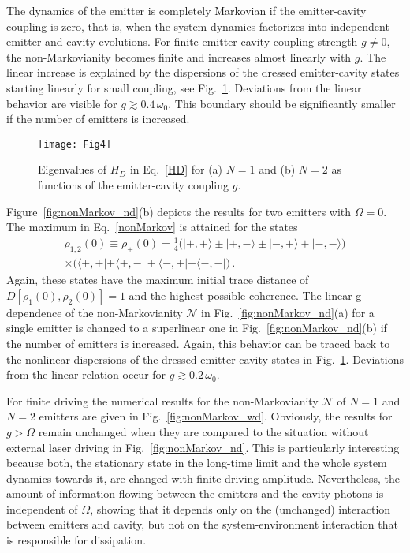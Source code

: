 \documentclass[aps,pra,twocolumn,showpacs,showkeys,10pt,nofootinbib]{revtex4-1}
\begin{document}
The dynamics of the emitter is completely Markovian if the emitter-cavity coupling is zero, that is, when the system dynamics factorizes into independent emitter and cavity evolutions.
For finite emitter-cavity coupling strength $g\neq0$, the non-Markovianity becomes finite and increases almost linearly with $g$.
The linear increase is explained by the dispersions of the dressed emitter-cavity states starting linearly for small coupling, see Fig.~\ref{fig:disp}.
Deviations from the linear behavior are visible for $g\gtrsim0.4\,\omega_0$.
This boundary should be significantly smaller if the number of emitters is increased.

\begin{figure}
  \texttt{[image: Fig4]}
  \caption{\label{fig:disp}Eigenvalues of $H_D$ in Eq.~\eqref{HD} for (a) $N=1$ and (b) $N=2$ as functions of the emitter-cavity coupling $g$.}
\end{figure}

Figure~\ref{fig:nonMarkov_nd}(b) depicts the results for two emitters with $\Omega=0$.
The maximum in Eq.~\eqref{nonMarkov} is attained for the states
\begin{multline}\label{preparation2}
  \rho_{1,2}(0) \equiv \rho_\pm(0) = \frac{1}{4} \big( | +, + \rangle \pm | +, - \rangle \pm | -, + \rangle + | -, - \rangle \big) \\
    \times \big( \langle +, + | \pm \langle +, - | \pm \langle -, + | + \langle -, - | \big) \,.
\end{multline}
Again, these states have the maximum initial trace distance of $D[\rho_1(0),\rho_2(0)]=1$ and the highest possible coherence.
The linear g-dependence of the non-Markovianity $\mathcal{N}$ in Fig.~\ref{fig:nonMarkov_nd}(a) for a single emitter is changed to a superlinear one in Fig.~\ref{fig:nonMarkov_nd}(b) if the number of emitters is increased.
Again, this behavior can be traced back to the nonlinear dispersions of the dressed emitter-cavity states in Fig.~\ref{fig:disp}.
Deviations from the linear relation occur for $g\gtrsim0.2\,\omega_0$.

For finite driving the numerical results for the non-Markovianity $\mathcal{N}$ of $N=1$ and $N=2$ emitters are given in Fig.~\ref{fig:nonMarkov_wd}.
Obviously, the results for $g>\Omega$ remain unchanged when they are compared to the situation without external laser driving in Fig.~\ref{fig:nonMarkov_nd}.
This is particularly interesting because both, the stationary state in the long-time limit and the whole system dynamics towards it, are changed with finite driving amplitude.
Nevertheless, the amount of information flowing between the emitters and the cavity photons is independent of $\Omega$, showing that it depends only on the (unchanged) interaction between emitters and cavity, but not on the system-environment interaction that is responsible for dissipation.
\end{document}
